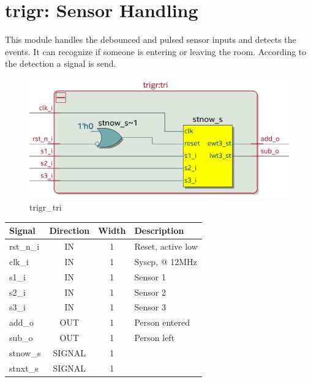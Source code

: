 \documentclass[12pt,a4 paper] {report}
\begin{document}
\newpage

\section{trigr: Sensor Handling}
This module handles the debounced and pulsed sensor inputs and detects the events. It can recognize if someone is entering 
or leaving the room. According to the detection a signal is send.
\begin{figure}[h]
	\centering	
	\includegraphics[scale=0.2]{../png/trigr_tri.png}
	\caption{trigr\_tri}
\end{figure}
\begin{center}
	\begin{tabular}{ | p{2cm} | c | c | p{5cm} |}
		\hline
		\textbf{Signal} & \textbf{Direction} & \textbf{Width} & \textbf{Description} \\
		\hline	
		rst\_n\_i & IN & 1 & Reset, active low \\
		\hline
		clk\_i & IN & 1 & Syscp, @ 12MHz \\
		\hline
		s1\_i & IN & 1 & Sensor 1 \\
		\hline
		s2\_i & IN & 1 & Sensor 2 \\
		\hline
		s3\_i & IN & 1 & Sensor 3 \\
		\hline
		add\_o & OUT & 1 & Person entered \\
		\hline
		sub\_o & OUT & 1 & Person left \\
		\hline
		\hline
		stnow\_s & SIGNAL & 1 & \\
		\hline
		stnxt\_s & SIGNAL & 1 & \\
		\hline

	\end{tabular}
\end{center}

\newpage
\end{document}
